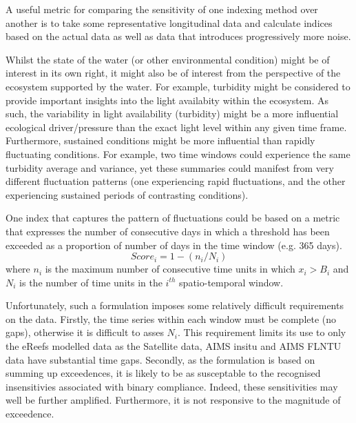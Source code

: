 A useful metric for comparing the sensitivity of one indexing method over another is to take some
representative longitudinal data and calculate indices based on the actual data as well as data that
introduces progressively more noise.

 




Whilst the state of the water (or other environmental condition) might be of interest in its own
right, it might also be of interest from the perspective of the ecosystem supported by the
water.  For example, turbidity might be considered to provide important insights into the
light availabity within the ecosystem.  As such, the variability in light availability (turbidity)
might be a more influential ecological driver/pressure than the exact light level within any given
time frame.  Furthermore, sustained conditions might be more influential than rapidly fluctuating
conditions.  For example, two time windows could experience the same turbidity average and variance, yet
these summaries could manifest from very different fluctuation patterns (one experiencing rapid fluctuations,
and the other experiencing sustained periods of contrasting conditions).

One index that captures the pattern of fluctuations could be based on a metric that expresses the number of
consecutive days in which a threshold has been exceeded as a proportion of number of days in the
time window (e.g. 365 days).
$$
Score_i = 1-(n_i/N_i)
$$
where $n_i$ is the maximum number of consecutive time units in which $x_i > B_i$ and $N_i$ is the number
of time units in the $i^{th}$ spatio-temporal window.

Unfortunately, such a formulation imposes some relatively difficult requirements on the data.
Firstly, the time series within each window must be complete (no gaps), otherwise it is difficult
to asses $N_i$. This requirement limits its use to only the eReefs modelled data as the Satellite
data, AIMS insitu and AIMS FLNTU data have substantial time gaps.  Secondly, as the formulation
is based on summing up exceedences, it is likely to be as susceptable to the recognised insensitivies
associated with binary compliance.  Indeed, these sensitivities may well be further amplified.
Furthermore, it is not responsive to the magnitude of exceedence.



